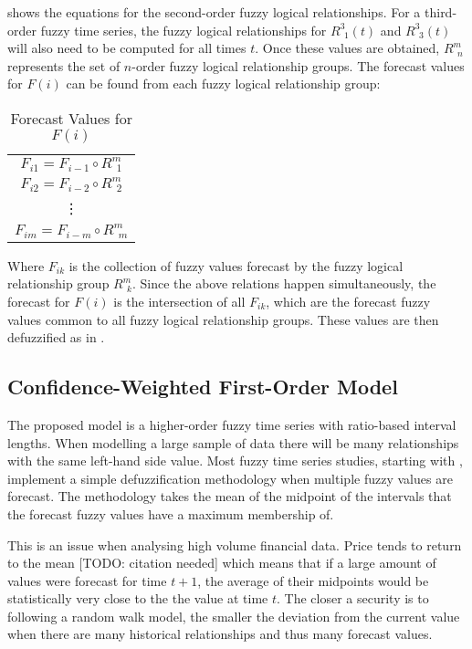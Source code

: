 \documentclass{article}
\theoremstyle{definition}
\begin{document}
 shows the equations for the second-order fuzzy logical relationships. For a third-order fuzzy time series, the fuzzy logical relationships for $R^{3}_{\ \ 1}(t)$ and $R^{3}_{\ \ 3}(t)$ will also need to be computed for all times $t$. Once these values are obtained, $R^{m}_{\ \ n}$ represents the set of $n$-order fuzzy logical relationship groups. The forecast values for $F(i)$ can be found from each fuzzy logical relationship group:

\begin{table}[H]
	\center
	\begin{tabular}{ c }
  	$F_{i1} = F_{i-1} \circ R^{m}_{\ \ 1}$ \\
  	$F_{i2} = F_{i-2} \circ R^{m}_{\ \ 2}$ \\
  	\vdots \\
  	$F_{im} = F_{i-m} \circ R^{m}_{\ \ m}$ \\
	\end{tabular}
	\caption{Forecast Values for $F(i)$}
\end{table}

Where $F_{ik}$ is the collection of fuzzy values forecast by the fuzzy logical relationship group $R^{m}_{\ \ k}$. Since the above relations happen simultaneously, the forecast for $F(i)$ is the intersection of all $F_{ik}$, which are the forecast fuzzy values common to all fuzzy logical relationship groups. These values are then defuzzified as in .

\subsection{Confidence-Weighted First-Order Model}

The proposed model is a higher-order fuzzy time series with ratio-based interval lengths. When modelling a large sample of data there will be many relationships with the same left-hand side value. Most fuzzy time series studies, starting with \cite{song1993forecasting}, implement a simple defuzzification methodology when multiple fuzzy values are forecast. The methodology takes the mean of the midpoint of the intervals that the forecast fuzzy values have a maximum membership of.

This is an issue when analysing high volume financial data. Price tends to return to the mean [TODO: citation needed] which means that if a large amount of values were forecast for time $t+1$, the average of their midpoints would be statistically very close to the the value at time $t$. The closer a security is to following a random walk model, the smaller the deviation from the current value when there are many historical relationships and thus many forecast values.
\end{document}
